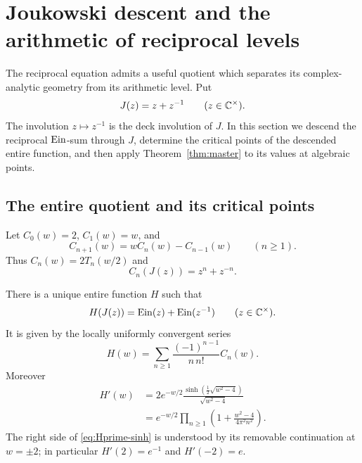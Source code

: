 \section{Joukowski descent and the arithmetic of reciprocal levels}
\label{sec:joukowski-descent}

The reciprocal equation admits a useful quotient which separates its
complex-analytic geometry from its arithmetic level.  Put
\[
 J(z)=z+z^{-1}\qquad(z\in\mathbb C^\times).
\]
The involution $z\mapsto z^{-1}$ is the deck involution of $J$.  In this
section we descend the reciprocal $\operatorname{Ein}$-sum through $J$, determine the
critical points of the descended entire function, and then apply
Theorem~\ref{thm:master} to its values at algebraic points.

\subsection{The entire quotient and its critical points}

Let $C_0(w)=2$, $C_1(w)=w$, and
\[
 C_{n+1}(w)=wC_n(w)-C_{n-1}(w)\qquad(n\geq1).
\]
Thus $C_n(w)=2T_n(w/2)$ and
\begin{equation}\label{eq:joukowski-chebyshev}
 C_n(J(z))=z^n+z^{-n}.
\end{equation}

\begin{proposition}\label{prop:entire-joukowski-descent}
There is a unique entire function $H$ such that
\begin{equation}\label{eq:H-descent}
 H(J(z))=\operatorname{Ein}(z)+\operatorname{Ein}(z^{-1})\qquad(z\in\mathbb C^\times).
\end{equation}
It is given by the locally uniformly convergent series
\begin{equation}\label{eq:H-chebyshev-series}
 H(w)=\sum_{n\geq1}\frac{(-1)^{n-1}}{n\,n!}C_n(w).
\end{equation}
Moreover
\begin{align}
 H'(w)
 &=2e^{-w/2}
   \frac{\sinh\!\left(\frac12\sqrt{w^2-4}\right)}{\sqrt{w^2-4}}
   \label{eq:Hprime-sinh}\\
 &=e^{-w/2}\prod_{n\geq1}
   \left(1+\frac{w^2-4}{4\pi^2n^2}\right).
   \label{eq:Hprime-product}
\end{align}
The right side of \eqref{eq:Hprime-sinh} is understood by its removable
continuation at $w=\pm2$; in particular $H'(2)=e^{-1}$ and
$H'(-2)=e$.
\end{proposition}

